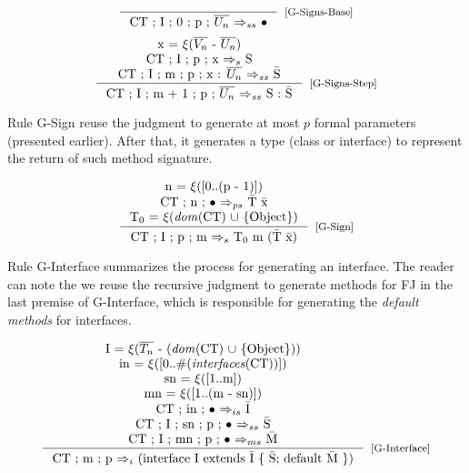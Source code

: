 \documentclass[tese,capa,english]{texufpel}
\begin{document}
\[
\inference{}
          {\textrm{CT ; I ; 0 ; p ; $\overline{U_n}$ $\Rightarrow_{ss}$ $\bullet$}}[\footnotesize{[G-Signs-Base]}]
\]
\[
\inference{\textrm{x = $\xi$($\overline{V_n}$ - $\overline{U_n}$)} \\
           \textrm{CT ; I ; p ; x $\Rightarrow_{s}$ S} \\
           \textrm{CT ; I ; m ; p ; x : $\overline{U_n}$ $\Rightarrow_{ss}$ \={S}}}
          {\textrm{CT ; I ; m + 1 ; p ; $\overline{U_n}$ $\Rightarrow_{ss}$ S : \={S}}}[\footnotesize{[G-Signs-Step]}]
\]

\vspace{5pt}

Rule {\footnotesize G-Sign} reuse the judgment to generate at most $p$ formal parameters (presented earlier). After that, it generates a type (class or interface) to represent the return of such method signature.

\[
\inference{\textrm{n = $\xi$([$0..$(p - 1)])} \\
           \textrm{CT ; n ; $\bullet$ $\Rightarrow_{ps}$ \={T} \={x}} \\
           \textrm{T$_0$ = $\xi$(\emph{dom}(CT) $\cup$ \{Object\})}}
           {\textrm{CT ; I ; p ; m $\Rightarrow_{s}$ T$_0$ m (\={T} \={x})}}[\footnotesize{[G-Sign]}]
\]

\vspace{5pt}

Rule {\footnotesize G-Interface} summarizes the process for generating an interface. The reader can note the we reuse the recursive judgment to generate methods for FJ in the last premise of {\footnotesize G-Interface}, which is responsible for generating the \emph{default methods} for interfaces.

\[
\inference{\textrm{I = $\xi$($\overline{T_n}$ - (\emph{dom}(CT) $\cup$ \{Object\}))} \\
           \textrm{in = $\xi$([$0 .. $\#(\emph{interfaces}(CT))])} \\
           \textrm{sn = $\xi$([$1 .. $m])} \\
           \textrm{mn = $\xi$([$1 .. $(m - sn)])} \\
           \textrm{CT ; in ; $\bullet$ $\Rightarrow_{is}$ \={I}} \\
           \textrm{CT ; I ; sn ; p ; $\bullet$ $\Rightarrow_{ss}$ \={S}} \\
           \textrm{CT ; I ; mn ; p ; $\bullet$ $\Rightarrow_{ms}$ \={M}}}
          {\textrm{CT ; m ; p $\Rightarrow_{i}$ (interface I extends \={I} \{ \={S}; default \={M} \})}}[\footnotesize{[G-Interface]}]
\]
\end{document}
